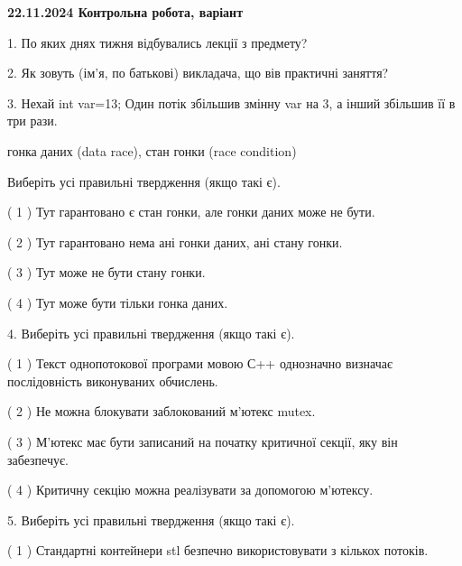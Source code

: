 \documentclass[12pt, ukrainian]{article}
\begin{document}
\vspace{4mm}
\newpage
\begin {large}

\textbf{22.11.2024 Контрольна робота, варіант  }\par


{
1. По яких днях тижня відбувались лекції з предмету?



\vspace{5mm}
2. Як зовуть (ім'я, по батькові) викладача, що вів практичні заняття?



\vspace{5mm}
3. Нехай int var=13; Один потік збільшив змінну var на 3, а інший збільшив її в три рази.

гонка даних (data race), стан гонки (race condition)

Виберіть усі правильні твердження (якщо такі є).\par
\vspace{2mm}
( 1 ) Тут гарантовано є стан гонки, але гонки даних може не бути.%

( 2 ) Тут гарантовано нема ані гонки даних, ані стану гонки.%

( 3 ) Тут може не бути стану гонки.%

( 4 ) Тут може бути тільки гонка даних.%


\vspace{5mm}
4. Виберіть усі правильні твердження (якщо такі є).\par
\vspace{2mm}

( 1 ) Текст однопотокової програми мовою С++ однозначно визначає послідовність виконуваних обчислень.%

( 2 ) Не можна блокувати заблокований м’ютекс mutex.%

( 3 ) М’ютекс має бути записаний на початку критичної секції, яку він забезпечує.%

( 4 ) Критичну секцію можна реалізувати за допомогою м’ютексу.%


\vspace{5mm}
5. Виберіть усі правильні твердження (якщо такі є).\par
\vspace{2mm}

( 1 ) Стандартні контейнери stl безпечно використовувати з кількох потоків.%

}
\end{large}
\end{document}
